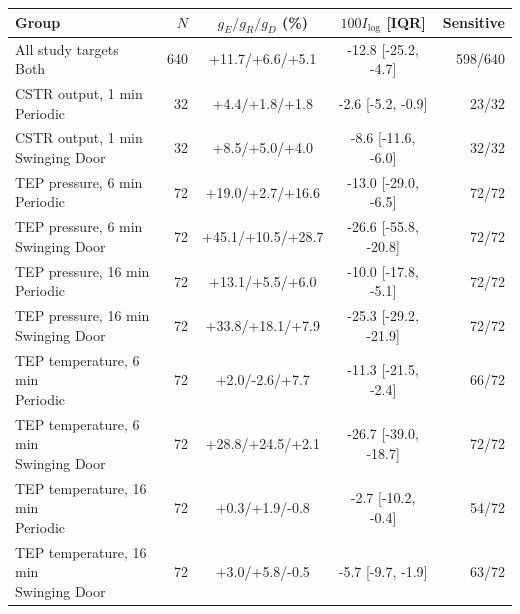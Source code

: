 \begin{tabular}{@{}lrccr@{}}
\toprule
Group & $N$ & $g_E/g_R/g_D$ (\%) & $100I_{\log}$ [IQR] & Sensitive \\
\midrule
\shortstack[l]{All study targets\\Both} & 640 & +11.7/+6.6/+5.1 & -12.8 [-25.2, -4.7] & 598/640 \\
\shortstack[l]{CSTR output, 1 min\\Periodic} & 32 & +4.4/+1.8/+1.8 & -2.6 [-5.2, -0.9] & 23/32 \\
\shortstack[l]{CSTR output, 1 min\\Swinging Door} & 32 & +8.5/+5.0/+4.0 & -8.6 [-11.6, -6.0] & 32/32 \\
\shortstack[l]{TEP pressure, 6 min\\Periodic} & 72 & +19.0/+2.7/+16.6 & -13.0 [-29.0, -6.5] & 72/72 \\
\shortstack[l]{TEP pressure, 6 min\\Swinging Door} & 72 & +45.1/+10.5/+28.7 & -26.6 [-55.8, -20.8] & 72/72 \\
\shortstack[l]{TEP pressure, 16 min\\Periodic} & 72 & +13.1/+5.5/+6.0 & -10.0 [-17.8, -5.1] & 72/72 \\
\shortstack[l]{TEP pressure, 16 min\\Swinging Door} & 72 & +33.8/+18.1/+7.9 & -25.3 [-29.2, -21.9] & 72/72 \\
\shortstack[l]{TEP temperature, 6 min\\Periodic} & 72 & +2.0/-2.6/+7.7 & -11.3 [-21.5, -2.4] & 66/72 \\
\shortstack[l]{TEP temperature, 6 min\\Swinging Door} & 72 & +28.8/+24.5/+2.1 & -26.7 [-39.0, -18.7] & 72/72 \\
\shortstack[l]{TEP temperature, 16 min\\Periodic} & 72 & +0.3/+1.9/-0.8 & -2.7 [-10.2, -0.4] & 54/72 \\
\shortstack[l]{TEP temperature, 16 min\\Swinging Door} & 72 & +3.0/+5.8/-0.5 & -5.7 [-9.7, -1.9] & 63/72 \\
\bottomrule
\end{tabular}
